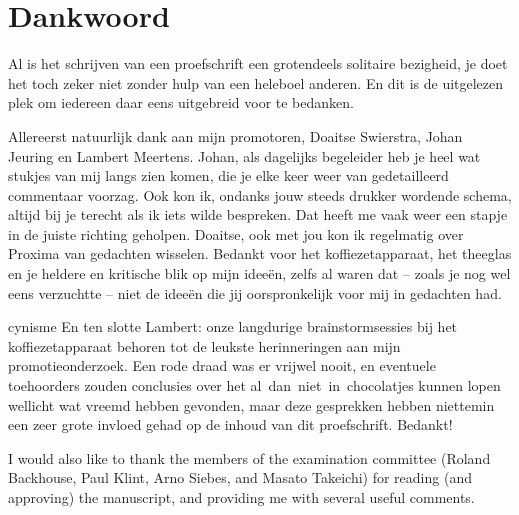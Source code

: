 \chapter*{Dankwoord}
\label{chap:dank}



Al is het schrijven van een proefschrift een grotendeels solitaire bezigheid, je doet het toch zeker niet zonder hulp van een heleboel anderen. En dit is de uitgelezen plek om iedereen daar eens uitgebreid voor te bedanken.

Allereerst natuurlijk dank aan mijn promotoren, Doaitse Swierstra, Johan Jeuring en Lambert Meertens. Johan, als dagelijks begeleider heb je heel wat stukjes van mij langs zien komen, die je elke keer  weer van gedetailleerd commentaar voorzag. Ook kon ik, ondanks jouw steeds drukker wordende schema, altijd bij je terecht als ik iets wilde bespreken. Dat heeft me vaak weer een stapje in de juiste richting geholpen. Doaitse, ook met jou kon ik regelmatig over Proxima van gedachten wisselen. Bedankt voor het koffiezetapparaat, het theeglas en je heldere en kritische blik op mijn idee\"en, zelfs al waren dat -- zoals je nog wel eens verzuchtte -- niet de idee\"en die jij oorspronkelijk voor mij in gedachten had.

\bc cynisme \ec 
En ten slotte Lambert: onze langdurige brainstormsessies bij het koffiezetapparaat behoren tot de leukste herinneringen aan mijn promotieonderzoek. Een rode draad was er vrijwel nooit, en eventuele toehoorders zouden conclusies over het al~dan~niet~in~chocola\-tjes kunnen lopen wellicht wat vreemd hebben gevonden, maar deze gesprekken hebben niettemin een zeer grote invloed gehad op de inhoud van dit proefschrift. Bedankt!


I would also like to thank the members of the examination committee (Roland Backhouse, Paul Klint, Arno Siebes, and Masato Takeichi) for reading (and approving) the manuscript, and providing me with several useful comments.

